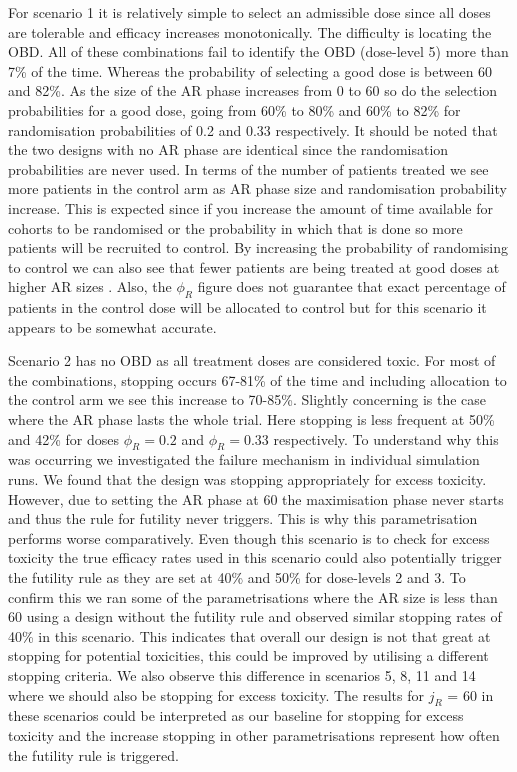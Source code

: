 \newpage

For scenario 1 it is relatively simple to select an admissible dose since all doses are tolerable and efficacy increases monotonically. The difficulty is locating the OBD. All of these combinations fail to identify the OBD (dose-level 5) more than 7\% of the time. Whereas the probability of selecting a good dose is between 60 and 82\%. As the size of the AR phase increases from 0 to 60 so do the selection probabilities for a good dose, going from 60\% to 80\% and 60\% to 82\% for randomisation probabilities of 0.2 and 0.33 respectively. It should be noted that the two designs with no AR phase are identical since the randomisation probabilities are never used. In terms of the number of patients treated we see more patients in the control arm as AR phase size and randomisation probability increase. This is expected since if you increase the amount of time available for cohorts to be randomised or the probability in which that is done so more patients will be recruited to control. By increasing the probability of randomising to control we can also see that fewer patients are being treated at good doses at higher AR sizes . Also, the $\phi_R$ figure does not guarantee that exact percentage of patients in the control dose will be allocated to control but for this scenario it appears to be somewhat accurate. 

Scenario 2 has no OBD as all treatment doses are considered toxic. For most of the combinations, stopping occurs 67-81\% of the time and including allocation to the control arm we see this increase to 70-85\%. Slightly concerning is the case where the AR phase lasts the whole trial. Here stopping is less frequent at 50\% and 42\% for doses $\phi_R = 0.2$ and $\phi_R = 0.33$ respectively. To understand why this was occurring we investigated the failure mechanism in individual simulation runs. We found that the design was stopping appropriately for excess toxicity. However, due to setting the AR phase at 60 the maximisation phase never starts and thus the rule for futility never triggers. This is why this parametrisation performs worse comparatively. Even though this scenario is to check for excess toxicity the true efficacy rates used in this scenario could also potentially trigger the futility rule as they are set at 40\% and 50\% for dose-levels 2 and 3. To confirm this we ran some of the parametrisations where the AR size is less than 60 using a design without the futility rule and observed similar stopping rates of 40\% in this scenario. This indicates that overall our design is not that great at stopping for potential toxicities, this could be improved by utilising a different stopping criteria. We also observe this difference in scenarios 5, 8, 11 and 14 where we should also be stopping for excess toxicity. The results for $j_R$ = 60 in these scenarios could be interpreted as our baseline for stopping for excess toxicity and the increase stopping in other parametrisations represent how often the futility rule is triggered.      

